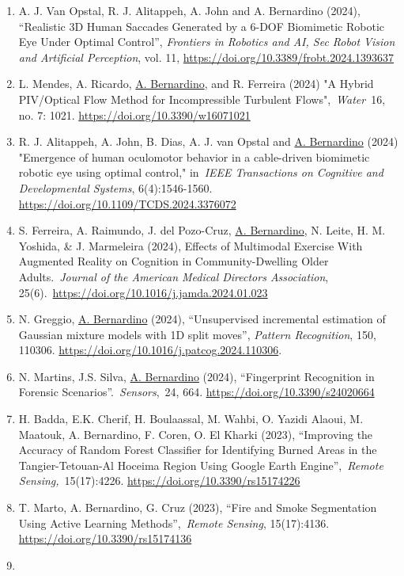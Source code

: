 \documentclass[
]{article}
\begin{document}
\begin{enumerate}
  \url{https://doi.org/10.1007/s12369-024-01128-y}
\item
  A. J. Van Opstal, R. J. Alitappeh, A. John and A. Bernardino (2024),
  ``Realistic 3D Human Saccades Generated by a 6-DOF Biomimetic Robotic
  Eye Under Optimal Control'', \emph{Frontiers in Robotics and AI, Sec
  Robot Vision and Artificial Perception}, vol. 11,
  \url{https://doi.org/10.3389/frobt.2024.1393637}
\item
  L. Mendes, A. Ricardo, \ul{A. Bernardino}, and R. Ferreira (2024) "A
  Hybrid PIV/Optical Flow Method for Incompressible Turbulent
  Flows",~\emph{Water}~16, no. 7: 1021.
  \url{https://doi.org/10.3390/w16071021}
\item
  R. J. Alitappeh, A. John, B. Dias, A. J. van Opstal and \ul{A.
  Bernardino} (2024) "Emergence of human oculomotor behavior in a
  cable-driven biomimetic robotic eye using optimal control,"
  in~\emph{IEEE Transactions on Cognitive and Developmental Systems},
  6(4):1546-1560. \url{https://doi.org/10.1109/TCDS.2024.3376072}
\item
  S. Ferreira, A. Raimundo, J. del Pozo-Cruz, \ul{A. Bernardino}, N.
  Leite, H. M. Yoshida, \& J. Marmeleira (2024), Effects of Multimodal
  Exercise With Augmented Reality on Cognition in Community-Dwelling
  Older Adults.~\emph{Journal of the American Medical Directors
  Association}, 25(6).~\url{https://doi.org/10.1016/j.jamda.2024.01.023}
\item
  N. Greggio, \ul{A. Bernardino} (2024), ``Unsupervised incremental
  estimation of Gaussian mixture models with 1D split moves'',
  \emph{Pattern Recognition}, 150, 110306.
  \url{https://doi.org/10.1016/j.patcog.2024.110306}.
\item
  N. Martins, J.S. Silva, \ul{A. Bernardino} (2024), ``Fingerprint
  Recognition in Forensic Scenarios''.~\emph{Sensors},~24, 664.
  \url{https://doi.org/10.3390/s24020664}
\item
  H. Badda, E.K. Cherif, H. Boulaassal, M. Wahbi, O. Yazidi Alaoui, M.
  Maatouk, A. Bernardino, F. Coren, O. El Kharki (2023), ``Improving the
  Accuracy of Random Forest Classifier for Identifying Burned Areas in
  the Tangier-Tetouan-Al Hoceima Region Using Google Earth
  Engine'',~\emph{Remote Sensing,}~15(17):4226.
  \url{https://doi.org/10.3390/rs15174226}
\item
  T. Marto, A. Bernardino, G. Cruz (2023), ``Fire and Smoke Segmentation
  Using Active Learning Methods'',~\emph{Remote Sensing}, 15(17):4136.
  \url{https://doi.org/10.3390/rs15174136}
\item

\end{enumerate}
\end{document}

